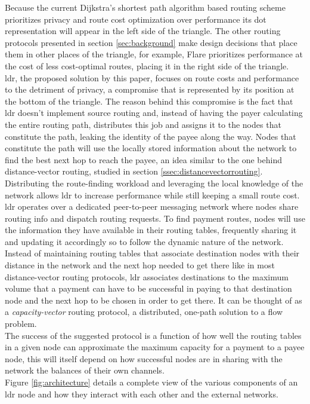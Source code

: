 Because the current Dijkstra's shortest path algorithm based routing scheme prioritizes privacy and route cost optimization over performance its dot representation will appear in the left side of the triangle. The other routing protocols presented in section \ref{sec:background} make design decisions that place them in other places of the triangle, for example, Flare prioritizes performance at the cost of less cost-optimal routes, placing it in the right side of the triangle. \\
\acrshort{ldr}, the proposed solution by this paper, focuses on route costs and performance to the detriment of privacy, a compromise that is represented by its position at the bottom of the triangle. The reason behind this compromise is the fact that \acrshort{ldr} doesn't implement source routing and, instead of having the payer calculating the entire routing path, distributes this job and assigns it to the nodes that constitute the path, leaking the identity of the payee along the way. Nodes that constitute the path will use the locally stored information about the network to find the best next hop to reach the payee, an idea similar to the one behind distance-vector routing, studied in section \ref{ssec:distancevectorrouting}. Distributing the route-finding workload and leveraging the local knowledge of the network allows \acrshort{ldr} to increase performance while still keeping a small route cost. \\
\acrshort{ldr} operates over a dedicated peer-to-peer messaging network where nodes share routing info and dispatch routing requests. To find payment routes, nodes will use the information they have available in their routing tables, frequently sharing it and updating it accordingly so to follow the dynamic nature of the network. Instead of maintaining routing tables that associate destination nodes with their distance in the network and the next hop needed to get there like in most distance-vector routing protocols, \acrshort{ldr} associates destinations to the maximum volume that a payment can have to be successful in paying to that destination node and the next hop to be chosen in order to get there. It can be thought of as a \textit{capacity-vector} routing protocol, a distributed, one-path solution to a flow problem. \\
The success of the suggested protocol is a function of how well the routing tables in a given node can approximate the maximum capacity for a payment to a payee node, this will itself depend on how successful nodes are in sharing with the network the balances of their own channels. \\
Figure \ref{fig:architecture} details a complete view of the various components of an \acrshort{ldr} node and how they interact with each other and the external networks.

